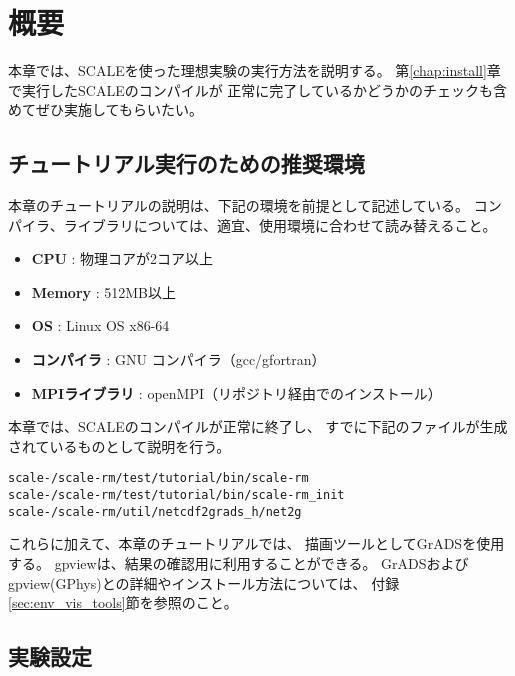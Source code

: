 \section{概要} \label{sec:ideal_exp_intro}

本章では、SCALEを使った理想実験の実行方法を説明する。
第\ref{chap:install}章で実行したSCALEのコンパイルが
正常に完了しているかどうかのチェックも含めてぜひ実施してもらいたい。


\subsection{チュートリアル実行のための推奨環境} \label{subsec:assumed_env}

本章のチュートリアルの説明は、下記の環境を前提として記述している。
コンパイラ、ライブラリについては、適宜、使用環境に合わせて読み替えること。

\begin{itemize}
 \item {\bf CPU} : 物理コアが2コア以上 %
 \item {\bf Memory} : 512MB以上 %
 \item {\bf OS} : Linux OS x86-64  %
 \item {\bf コンパイラ} : GNU コンパイラ（gcc/gfortran）
 \item {\bf MPIライブラリ} : openMPI（リポジトリ経由でのインストール）
\end{itemize}

本章では、SCALEのコンパイルが正常に終了し、
すでに下記のファイルが生成されているものとして説明を行う。
\begin{alltt} 
  scale-{\version}/scale-rm/test/tutorial/bin/scale-rm
  scale-{\version}/scale-rm/test/tutorial/bin/scale-rm_init
  scale-{\version}/scale-rm/util/netcdf2grads_h/net2g
\end{alltt}
これらに加えて、本章のチュートリアルでは、
描画ツールとしてGrADSを使用する。
gpviewは、結果の確認用に利用することができる。
GrADSおよびgpview(GPhys)との詳細やインストール方法については、
付録 \ref{sec:env_vis_tools}節を参照のこと。


\subsection{実験設定} \label{subsec:idealexpsetup}

